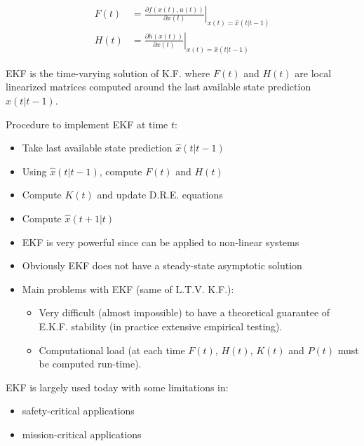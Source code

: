 \begin{align*}
    F(t) &=  \left.\frac{ \partial f(x(t), u(t))}{\partial x(t)} \right|_{x(t) = \hat{x}(t|t-1)} \\
    H(t) &= \left. \frac{\partial h(x(t))}{\partial x(t)} \right|_{x(t) = \hat{x}(t|t-1)}
\end{align*}

EKF is the time-varying solution of K.F. where $F(t)$ and $H(t)$ are local linearized matrices computed around the last available state prediction $\hat{x}(t|t-1)$.

Procedure to implement EKF at time $t$:
\begin{itemize}
    \item Take last available state prediction $\hat{x}(t|t-1)$
    \item Using $\hat{x}(t|t-1)$, compute $F(t)$ and $H(t)$
    \item Compute $K(t)$ and update D.R.E. equations
    \item Compute $\hat{x}(t+1|t)$
\end{itemize}

\begin{remark}
    \begin{itemize}
        \item EKF is very powerful since can be applied to non-linear systems
        \item Obviously EKF does not have a steady-state asymptotic solution
        \item Main problems with EKF (same of L.T.V. K.F.):
        \begin{itemize}
            \item Very difficult (almost impossible) to have a theoretical guarantee of E.K.F. stability (in practice extensive empirical testing).
            \item Computational load (at each time $F(t)$, $H(t)$, $K(t)$ and $P(t)$ must be computed run-time).
        \end{itemize}
    \end{itemize}

    EKF is largely used today with some limitations in:
    \begin{itemize}
        \item safety-critical applications
        \item mission-critical applications
    \end{itemize}
\end{remark}

